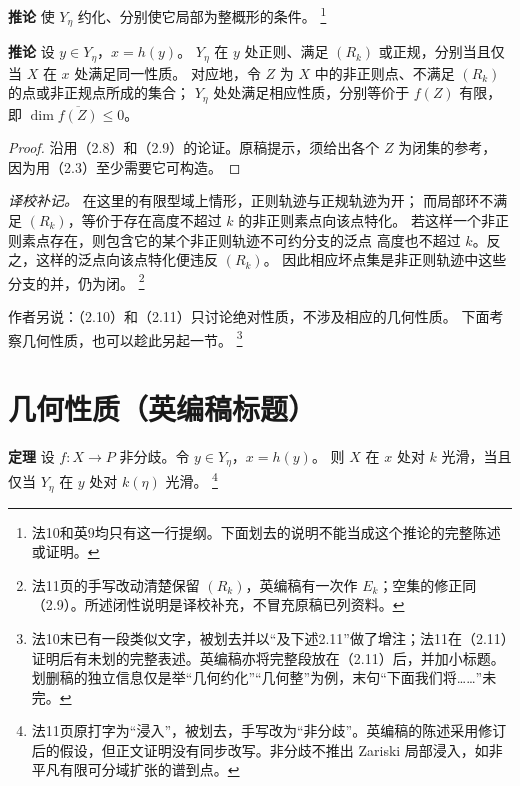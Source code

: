\documentclass[openany,fontset=fandol]{ctexbook}
\newcommand{\tagitem}[2]{\par\medskip\noindent\textbf{#1\quad #2}\enspace}
\begin{document}
\tagitem{推论}{2.10}
使 $Y_\eta$ 约化、分别使它局部为整概形的条件。%
\footnote{法10和英9均只有这一行提纲。下面划去的说明不能当成这个推论的完整陈述或证明。}

\tagitem{推论}{2.11}
设 $y\in Y_\eta$，$x=h(y)$。
$Y_\eta$ 在 $y$ 处正则、满足 $(R_k)$ 或正规，分别当且仅当 $X$ 在 $x$ 处满足同一性质。
对应地，令 $Z$ 为 $X$ 中的非正则点、不满足 $(R_k)$ 的点或非正规点所成的集合；
$Y_\eta$ 处处满足相应性质，分别等价于 $f(Z)$ 有限，即 $\dim\overline{f(Z)}\le0$。
\begin{proof}
沿用（2.8）和（2.9）的论证。原稿提示，须给出各个 $Z$ 为闭集的参考，
因为用（2.3）至少需要它可构造。
\end{proof}
\noindent\emph{译校补记。}
在这里的有限型域上情形，正则轨迹与正规轨迹为开；
而局部环不满足 $(R_k)$，等价于存在高度不超过 $k$ 的非正则素点向该点特化。
若这样一个非正则素点存在，则包含它的某个非正则轨迹不可约分支的泛点
高度也不超过 $k$。反之，这样的泛点向该点特化便违反 $(R_k)$。
因此相应坏点集是非正则轨迹中这些分支的并，仍为闭。%
\footnote{法11页的手写改动清楚保留 $(R_k)$，英编稿有一次作 $E_k$；空集的修正同（2.9）。所述闭性说明是译校补充，不冒充原稿已列资料。}

作者另说：（2.10）和（2.11）只讨论绝对性质，不涉及相应的几何性质。
下面考察几何性质，也可以趁此另起一节。%
\footnote{法10末已有一段类似文字，被划去并以“及下述2.11”做了增注；法11在（2.11）证明后有未划的完整表述。英编稿亦将完整段放在（2.11）后，并加小标题。划删稿的独立信息仅是举“几何约化”“几何整”为例，末句“下面我们将……”未完。}

\section*{几何性质（英编稿标题）}
\tagitem{定理}{2.12}
设 $f:X\to P$ 非分歧。令 $y\in Y_\eta$，$x=h(y)$。
则 $X$ 在 $x$ 处对 $k$ 光滑，当且仅当 $Y_\eta$ 在 $y$ 处对 $k(\eta)$ 光滑。%
\footnote{法11页原打字为“浸入”，被划去，手写改为“非分歧”。英编稿的陈述采用修订后的假设，但正文证明没有同步改写。非分歧不推出 Zariski 局部浸入，如非平凡有限可分域扩张的谱到点。}
\end{document}
